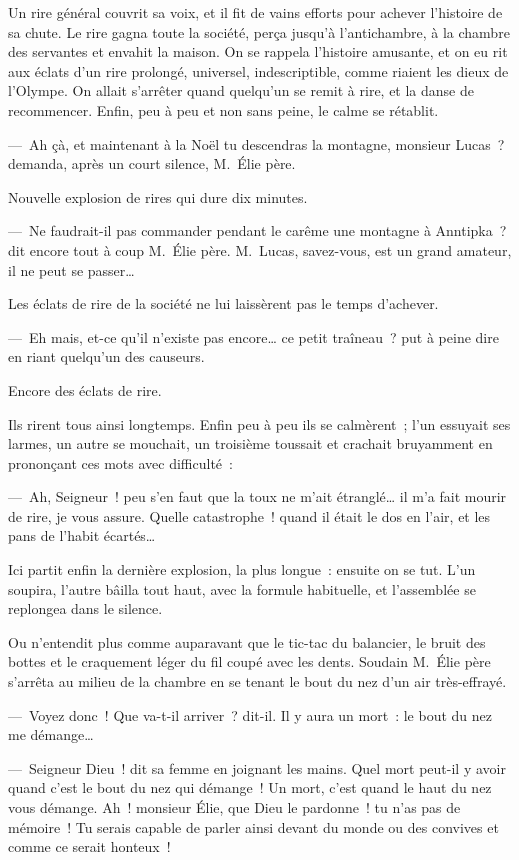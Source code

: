 \documentclass[french,twoside]{book} %
\begin{document}
Un rire général couvrit sa voix, et il fit de vains efforts pour achever l’histoire de sa chute. Le rire gagna toute la société, perça jusqu’à l’antichambre, à la chambre des servantes et envahit la maison. On se rappela l’histoire amusante, et on eu rit aux éclats d’un rire prolongé, universel, indescriptible, comme riaient les dieux de l’Olympe. On allait s’arrêter quand quelqu’un se remit à rire, et la danse de recommencer. Enfin, peu à peu et non sans peine, le calme se rétablit.\par
— Ah çà, et maintenant à la Noël tu descendras la montagne, monsieur Lucas ? demanda, après un court silence, M. Élie père.\par
Nouvelle explosion de rires qui dure dix minutes.\par
— Ne faudrait-il pas commander pendant le carême une montagne à Anntipka ? dit encore tout à coup M. Élie père. M. Lucas, savez-vous, est un grand amateur, il ne peut se passer…\par
Les éclats de rire de la société ne lui laissèrent pas le temps d’achever.\par
— Eh mais, et-ce qu’il n’existe pas encore… ce petit traîneau ? put à peine dire en riant quelqu’un des causeurs.\par
Encore des éclats de rire.\par
Ils rirent tous ainsi longtemps. Enfin peu à peu ils se calmèrent ; l’un essuyait ses larmes, un autre se mouchait, un troisième toussait et crachait bruyamment en prononçant ces mots avec difficulté :\par
— Ah, Seigneur ! peu s’en faut que la toux ne m’ait étranglé… il m’a fait mourir de rire, je vous assure. Quelle catastrophe ! quand il était le dos en l’air, et les pans de l’habit écartés…\par
Ici partit enfin la dernière explosion, la plus longue : ensuite on se tut. L’un soupira, l’autre bâilla tout haut, avec la formule habituelle, et l’assemblée se replongea dans le silence.\par
Ou n’entendit plus comme auparavant que le tic-tac du balancier, le bruit des bottes et le craquement léger du fil coupé avec les dents. Soudain M. Élie père s’arrêta au milieu de la chambre en se tenant le bout du nez d’un air très-effrayé.\par
— Voyez donc ! Que va-t-il arriver ? dit-il. Il y aura un mort : le bout du nez me démange…\par
— Seigneur Dieu ! dit sa femme en joignant les mains. Quel mort peut-il y avoir quand c’est le bout du nez qui démange ! Un mort, c’est quand le haut du nez vous démange. Ah ! monsieur Élie, que Dieu le pardonne ! tu n’as pas de mémoire ! Tu serais capable de parler ainsi devant du monde ou des convives et comme ce serait honteux !\par
\end{document}
